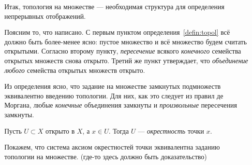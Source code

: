 Итак, топология на множестве --- необходимая структура для определения непрерывных отображений.

Поясним то, что написано. С первым пунктом определения~\ref{defin:topol} всё должно быть более-менее ясно: пустое множество и всё множество будем считать открытыми. Согласно второму пункту, \textit{пересечение} всякого \textit{конечного} семейства открытых множеств снова открыто. Третий же пункт утверждает, что \textit{объединение} \textit{любого} семейства открытых множеств открыто.

Из определения ясно, что задание на множестве замкнутых подмножеств эквивалентно введению топологии. Для них, как это следует из правил де Моргана, любые \textit{конечные} объединения замкнуты и \textit{произвольные} пересечения замкнуты.
\begin{defin}
	Пусть $U\subset X$ открыто в $X$, а $x\in U$. Тогда $U$ --- \textit{окрестность} точки $x$.
\end{defin}

Покажем, что система аксиом окрестностей точки эквивалентна заданию топологии на множестве. (где-то здесь должно быть доказательство)

